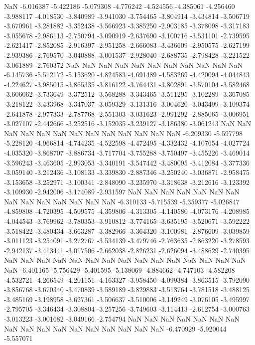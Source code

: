 NaN
-6.016387
-5.422186
-5.079308
-4.776242
-4.524556
-4.385061
-4.256460
-3.988117
-4.018530
-3.840989
-3.941030
-3.754465
-3.804914
-3.434814
-3.506719
-3.670961
-3.281882
-3.352438
-3.566923
-3.385250
-2.903185
-3.378098
-3.317183
-3.055678
-2.986113
-2.750794
-3.090919
-2.637690
-3.100716
-3.531101
-2.739595
-2.621417
-2.852085
-2.916397
-2.951258
-2.666083
-3.436609
-2.950575
-2.627199
-2.939386
-2.769570
-3.040888
-3.001537
-2.928040
-2.688735
-2.798428
-3.221522
-3.061889
-2.760372
NaN
NaN
NaN
NaN
NaN
NaN
NaN
NaN
NaN
NaN
NaN
-6.145736
-5.512172
-5.153620
-4.824583
-4.691489
-4.583269
-4.420094
-4.044843
-4.224627
-3.985015
-3.865335
-3.816122
-3.764431
-3.802891
-3.570104
-3.582468
-3.606062
-3.733649
-3.372512
-3.568288
-3.343465
-3.511295
-3.102289
-3.367085
-3.218122
-3.433968
-3.347037
-3.059329
-3.131316
-3.004620
-3.043499
-3.109374
-2.641878
-2.977333
-2.787768
-2.551303
-3.031623
-2.991292
-2.885065
-3.006951
-3.027107
-2.442666
-3.252516
-3.152035
-3.239127
-3.186380
-3.061243
NaN
NaN
NaN
NaN
NaN
NaN
NaN
NaN
NaN
NaN
NaN
NaN
NaN
-6.209330
-5.597798
-5.228120
-4.966814
-4.744235
-4.522598
-4.472495
-4.332432
-4.107654
-4.027724
-4.035320
-3.868707
-3.886734
-3.717704
-3.755288
-3.750497
-3.455226
-3.469014
-3.596243
-3.463605
-2.993053
-3.340191
-3.547442
-3.480095
-3.412084
-3.377336
-3.059140
-3.212436
-3.108133
-3.339830
-2.887346
-3.250240
-3.036871
-2.958475
-3.153658
-3.252971
-3.100341
-2.848090
-3.235970
-3.318638
-3.212616
-3.123392
-3.109930
-2.942006
-3.174089
-2.931597
NaN
NaN
NaN
NaN
NaN
NaN
NaN
NaN
NaN
NaN
NaN
NaN
NaN
NaN
-6.310133
-5.715539
-5.359377
-5.026847
-4.859808
-4.720395
-4.509575
-4.359806
-4.313305
-4.140580
-4.073176
-4.208985
-4.044543
-3.769962
-3.780353
-3.910812
-3.774165
-3.635195
-3.520671
-3.592222
-3.518422
-3.480434
-3.663287
-3.382966
-3.364320
-3.100981
-2.876609
-3.039859
-3.011123
-3.254091
-3.272767
-3.534139
-3.479746
-2.763635
-2.863220
-3.278593
-2.942137
-3.413441
-3.017506
-2.662038
-2.826231
-2.626094
-3.488629
-2.740395
NaN
NaN
NaN
NaN
NaN
NaN
NaN
NaN
NaN
NaN
NaN
NaN
NaN
NaN
NaN
NaN
-6.401165
-5.756429
-5.401595
-5.138069
-4.884662
-4.747103
-4.582208
-4.532721
-4.266549
-4.201151
-4.163327
-3.958450
-4.099384
-3.863515
-3.792090
-3.856768
-3.670340
-3.470839
-3.589189
-3.829883
-3.513764
-3.781518
-3.488125
-3.485169
-3.198958
-3.627361
-3.506637
-3.510006
-3.149249
-3.076105
-3.495997
-2.795705
-3.346434
-3.308804
-3.257256
-3.749603
-3.114413
-2.612754
-3.000763
-3.013223
-3.001682
-3.049166
-2.754794
NaN
NaN
NaN
NaN
NaN
NaN
NaN
NaN
NaN
NaN
NaN
NaN
NaN
NaN
NaN
NaN
NaN
-6.470929
-5.920044
-5.557071
